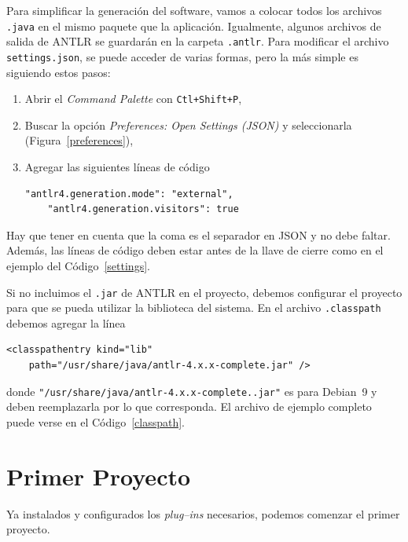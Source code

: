 \documentclass[a5paper,10pt]{article}
\begin{document}
Para simplificar la generación del software, vamos a colocar todos los archivos \verb|.java| en el mismo paquete que la aplicación.  Igualmente, algunos archivos de salida de ANTLR se guardarán en la carpeta \verb|.antlr|.  Para modificar el archivo \verb|settings.json|, se puede acceder de varias formas, pero la más simple es siguiendo estos pasos:
\begin{enumerate}
	\item Abrir el \emph{Command Palette} con \verb|Ctl+Shift+P|,
	\item Buscar la opción \emph{Preferences: Open Settings (JSON)} y seleccionarla (Figura~\ref{preferences}),
	\item Agregar las siguientes líneas de código
	\begin{lstlisting}[style=miJSON]
	"antlr4.generation.mode": "external",
	"antlr4.generation.visitors": true
	\end{lstlisting}
\end{enumerate}
Hay que tener en cuenta que la coma es el separador en JSON y no debe faltar.  Además, las líneas de código deben estar antes de la llave de cierre como en el ejemplo del Código~\ref{settings}.



Si no incluimos el \verb|.jar| de ANTLR en el proyecto, debemos configurar el proyecto para que se pueda utilizar la biblioteca del sistema.  En el archivo \verb|.classpath| debemos agregar la línea
\begin{lstlisting}[style=miXML]
<classpathentry kind="lib"
    path="/usr/share/java/antlr-4.x.x-complete.jar" />	
\end{lstlisting}
donde \verb|"/usr/share/java/antlr-4.x.x-complete..jar"| es para Debian~9 y deben reemplazarla por lo que corresponda.  El archivo de ejemplo completo puede verse en el Código~\ref{classpath}.




\section{Primer Proyecto}
\label{primerproyecto}

Ya instalados y configurados los \emph{plug--ins} necesarios, podemos comenzar el primer proyecto.
\end{document}
